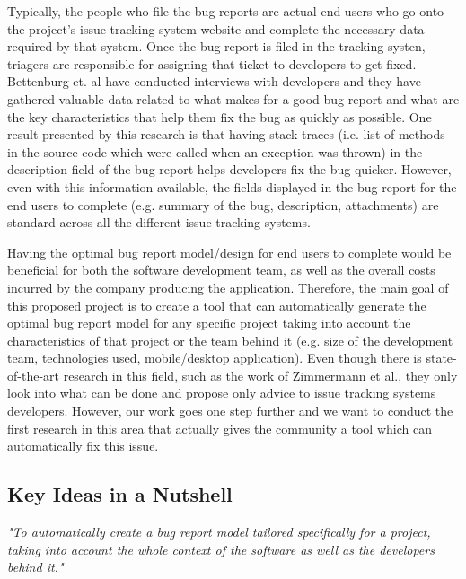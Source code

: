 \documentclass[11pt,english,twocolumn]{article}
\begin{document}
Typically, the people who file the bug reports are actual end users who go onto the project's
issue tracking system website and complete the necessary data required by that system. 
Once the bug report is filed in the tracking systen, triagers are responsible for assigning
that ticket to developers to get fixed. Bettenburg et. al \cite{bettenburg2008makes} have 
conducted interviews with developers and they have gathered valuable data related to what
makes for a good bug report and what are the key characteristics that
help them fix the bug as quickly as possible. One result presented by this research is that
having stack traces (i.e. list of methods in the source code which were called when an exception
was thrown) in the description field of the bug report helps developers fix the bug quicker.
However, even with this information available, the fields displayed in the bug report
for the end users to complete (e.g. summary of the bug, description, attachments) are standard
across all the different issue tracking systems.

Having the optimal bug report model/design for end users to complete would be beneficial for both 
the software development team, as well as the overall costs incurred by the company producing
the application. Therefore, the main goal of this proposed project is to create a tool 
that can automatically generate the optimal bug report model for any specific project taking 
into account the characteristics of that project or the team behind it (e.g. size of the
development team, technologies used, mobile/desktop application). Even though there is 
state-of-the-art research in this field, such as the work of Zimmermann et al.\cite{zimmermann2009improving},
they only look into what can be done and propose only advice to issue tracking systems developers.
However, our work goes one step further and we want to conduct the first research in this area
that actually gives the community a tool which can automatically fix this issue.

\subsection*{Key Ideas in a Nutshell}

\emph{"To automatically create a bug report model tailored specifically
for a project, taking into account the whole context of the software as 
well as the developers behind it."}
\end{document}
